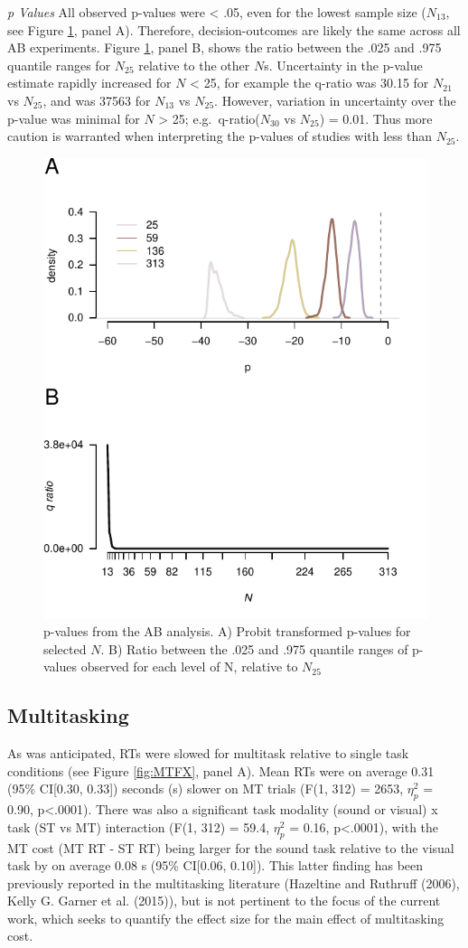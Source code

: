 \documentclass{article}
\begin{document}
\emph{p Values} All observed p-values were \textless{} .05, even for the lowest sample size (\(N_{13}\), see Figure \ref{fig:ABps}, panel A). Therefore, decision-outcomes are likely the same across all AB experiments. Figure \ref{fig:ABps}, panel B, shows the ratio between the .025 and .975 quantile ranges for \(N_{25}\) relative to the other \(N\)s. Uncertainty in the p-value estimate rapidly increased for \(N\) \textless{} 25, for example the q-ratio was 30.15 for \(N_{21}\) vs \(N_{25}\), and was 37563 for \(N_{13}\) vs \(N_{25}\). However, variation in uncertainty over the p-value was minimal for \(N\) \textgreater{} 25; e.g.~q-ratio(\(N_{30}\) vs \(N_{25}\)) = 0.01. Thus more caution is warranted when interpreting the p-values of studies with less than \(N_{25}\).

\begin{figure}

{\centering \includegraphics[width=0.4\linewidth]{../images/IMMAB_ps} 

}

\caption{p-values from the AB analysis. A) Probit transformed p-values for selected $N$. B) Ratio between the .025 and .975 quantile ranges of p-values observed for each level of N, relative to $N_{25}$}\label{fig:ABps}
\end{figure}

\hypertarget{multitasking}{%
\subsection{Multitasking}\label{multitasking}}

As was anticipated, RTs were slowed for multitask relative to single task conditions (see Figure \ref{fig:MTFX}, panel A). Mean RTs were on average 0.31 (95\% CI{[}0.30, 0.33{]}) seconds (s) slower on MT trials (F(1, 312) = 2653, \(\eta_{p}^2\) = 0.90, p\textless.0001). There was also a significant task modality (sound or visual) x task (ST vs MT) interaction (F(1, 312) = 59.4, \(\eta_{p}^2\) = 0.16, p\textless.0001), with the MT cost (MT RT - ST RT) being larger for the sound task relative to the visual task by on average 0.08 s (95\% CI{[}0.06, 0.10{]}). This latter finding has been previously reported in the multitasking literature (Hazeltine and Ruthruff (2006), Kelly G. Garner et al. (2015)), but is not pertinent to the focus of the current work, which seeks to quantify the effect size for the main effect of multitasking cost.
\end{document}
